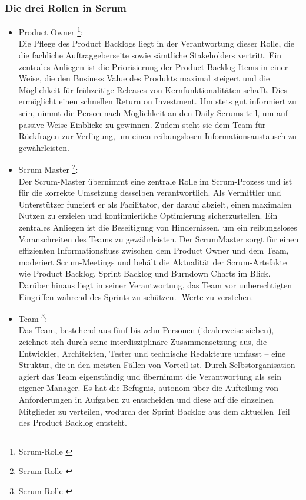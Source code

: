 \subsubsection{Die drei Rollen in Scrum}
\begin{itemize}
    \item Product Owner \footnote{Scrum-Rolle \cite{Product-Owner}}: \\
    Die Pflege des Product Backlogs liegt in der Verantwortung dieser Rolle, die die fachliche Auftraggeberseite
    sowie sämtliche Stakeholders vertritt. Ein zentrales Anliegen ist die Priorisierung der Product Backlog
    Items in einer Weise, die den Business Value des Produkts maximal steigert und die Möglichkeit für
    frühzeitige Releases von Kernfunktionalitäten schafft. Dies ermöglicht einen schnellen Return on Investment.
    Um stets gut informiert zu sein, nimmt die Person nach Möglichkeit an den Daily Scrums teil, um auf passive
    Weise Einblicke zu gewinnen. Zudem steht sie dem Team für Rückfragen zur Verfügung, um einen reibungslosen
    Informationsaustausch zu gewährleisten.
    \item Scrum Master \footnote{Scrum-Rolle \cite{Scrum-Master}}: \\
    Der Scrum-Master übernimmt eine zentrale Rolle im Scrum-Prozess und ist für die korrekte Umsetzung desselben verantwortlich.
    Als Vermittler und Unterstützer fungiert er als Facilitator, der darauf abzielt, einen maximalen Nutzen zu erzielen
    und kontinuierliche Optimierung sicherzustellen. Ein zentrales Anliegen ist die Beseitigung von Hindernissen, um
    ein reibungsloses Voranschreiten des Teams zu gewährleisten. Der ScrumMaster sorgt für einen effizienten
    Informationsfluss zwischen dem Product Owner und dem Team, moderiert Scrum-Meetings und behält die Aktualität
    der Scrum-Artefakte wie Product Backlog, Sprint Backlog und Burndown Charts im Blick. Darüber hinaus liegt in
    seiner Verantwortung, das Team vor unberechtigten Eingriffen während des Sprints zu schützen.
    -Werte zu verstehen.
    \item Team \footnote{Scrum-Rolle \cite{Team}}: \\
    Das Team, bestehend aus fünf bis zehn Personen (idealerweise sieben), zeichnet sich durch seine interdisziplinäre
    Zusammensetzung aus, die Entwickler, Architekten, Tester und technische Redakteure umfasst – eine Struktur, die in
    den meisten Fällen von Vorteil ist. Durch Selbstorganisation agiert das Team eigenständig und übernimmt die
    Verantwortung als sein eigener Manager. Es hat die Befugnis, autonom über die Aufteilung von Anforderungen in
    Aufgaben zu entscheiden und diese auf die einzelnen Mitglieder zu verteilen, wodurch der Sprint Backlog aus dem
    aktuellen Teil des Product Backlog entsteht.\\
\end{itemize}
